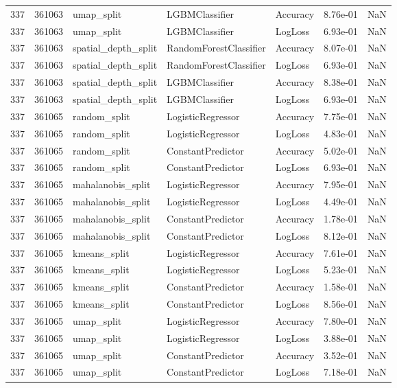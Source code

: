 \begin{tabular}{rrlllrr}
337 & 361063 & umap\_split & LGBMClassifier & Accuracy & 8.76e-01 & NaN \\
337 & 361063 & umap\_split & LGBMClassifier & LogLoss & 6.93e-01 & NaN \\
337 & 361063 & spatial\_depth\_split & RandomForestClassifier & Accuracy & 8.07e-01 & NaN \\
337 & 361063 & spatial\_depth\_split & RandomForestClassifier & LogLoss & 6.93e-01 & NaN \\
337 & 361063 & spatial\_depth\_split & LGBMClassifier & Accuracy & 8.38e-01 & NaN \\
337 & 361063 & spatial\_depth\_split & LGBMClassifier & LogLoss & 6.93e-01 & NaN \\
337 & 361065 & random\_split & LogisticRegressor & Accuracy & 7.75e-01 & NaN \\
337 & 361065 & random\_split & LogisticRegressor & LogLoss & 4.83e-01 & NaN \\
337 & 361065 & random\_split & ConstantPredictor & Accuracy & 5.02e-01 & NaN \\
337 & 361065 & random\_split & ConstantPredictor & LogLoss & 6.93e-01 & NaN \\
337 & 361065 & mahalanobis\_split & LogisticRegressor & Accuracy & 7.95e-01 & NaN \\
337 & 361065 & mahalanobis\_split & LogisticRegressor & LogLoss & 4.49e-01 & NaN \\
337 & 361065 & mahalanobis\_split & ConstantPredictor & Accuracy & 1.78e-01 & NaN \\
337 & 361065 & mahalanobis\_split & ConstantPredictor & LogLoss & 8.12e-01 & NaN \\
337 & 361065 & kmeans\_split & LogisticRegressor & Accuracy & 7.61e-01 & NaN \\
337 & 361065 & kmeans\_split & LogisticRegressor & LogLoss & 5.23e-01 & NaN \\
337 & 361065 & kmeans\_split & ConstantPredictor & Accuracy & 1.58e-01 & NaN \\
337 & 361065 & kmeans\_split & ConstantPredictor & LogLoss & 8.56e-01 & NaN \\
337 & 361065 & umap\_split & LogisticRegressor & Accuracy & 7.80e-01 & NaN \\
337 & 361065 & umap\_split & LogisticRegressor & LogLoss & 3.88e-01 & NaN \\
337 & 361065 & umap\_split & ConstantPredictor & Accuracy & 3.52e-01 & NaN \\
337 & 361065 & umap\_split & ConstantPredictor & LogLoss & 7.18e-01 & NaN \\

\end{tabular}
